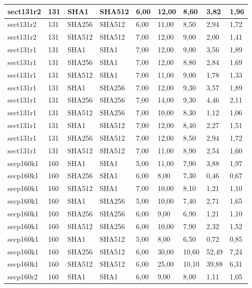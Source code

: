 \begin{longtable}{| l | l | l | l | l |l |l |l |l |}
sect131r2 & 131 & SHA1 & SHA512 & 6,00 & 12,00 & 8,60 & 3,82 & 1,96 \\ \hline 
sect131r2 & 131 & SHA256 & SHA512 & 6,00 & 11,00 & 8,50 & 2,94 & 1,72 \\ \hline 
sect131r2 & 131 & SHA512 & SHA512 & 7,00 & 12,00 & 9,00 & 2,00 & 1,41 \\ \hline 
sect131r1 & 131 & SHA1 & SHA1 & 7,00 & 12,00 & 9,00 & 3,56 & 1,89 \\ \hline 
sect131r1 & 131 & SHA256 & SHA1 & 7,00 & 12,00 & 8,80 & 2,84 & 1,69 \\ \hline 
sect131r1 & 131 & SHA512 & SHA1 & 7,00 & 11,00 & 9,00 & 1,78 & 1,33 \\ \hline 
sect131r1 & 131 & SHA1 & SHA256 & 7,00 & 12,00 & 9,30 & 3,57 & 1,89 \\ \hline 
sect131r1 & 131 & SHA256 & SHA256 & 7,00 & 14,00 & 9,30 & 4,46 & 2,11 \\ \hline 
sect131r1 & 131 & SHA512 & SHA256 & 7,00 & 10,00 & 8,30 & 1,12 & 1,06 \\ \hline 
sect131r1 & 131 & SHA1 & SHA512 & 7,00 & 12,00 & 8,40 & 2,27 & 1,51 \\ \hline 
sect131r1 & 131 & SHA256 & SHA512 & 7,00 & 12,00 & 8,50 & 2,94 & 1,72 \\ \hline 
sect131r1 & 131 & SHA512 & SHA512 & 7,00 & 11,00 & 8,90 & 2,54 & 1,60 \\ \hline 
secp160k1 & 160 & SHA1 & SHA1 & 5,00 & 11,00 & 7,90 & 3,88 & 1,97 \\ \hline 
secp160k1 & 160 & SHA256 & SHA1 & 6,00 & 8,00 & 7,30 & 0,46 & 0,67 \\ \hline 
secp160k1 & 160 & SHA512 & SHA1 & 7,00 & 10,00 & 8,10 & 1,21 & 1,10 \\ \hline 
secp160k1 & 160 & SHA1 & SHA256 & 5,00 & 10,00 & 7,40 & 2,71 & 1,65 \\ \hline 
secp160k1 & 160 & SHA256 & SHA256 & 6,00 & 9,00 & 6,90 & 1,21 & 1,10 \\ \hline 
secp160k1 & 160 & SHA512 & SHA256 & 6,00 & 10,00 & 7,90 & 2,32 & 1,52 \\ \hline 
secp160k1 & 160 & SHA1 & SHA512 & 5,00 & 8,00 & 6,50 & 0,72 & 0,85 \\ \hline 
secp160k1 & 160 & SHA256 & SHA512 & 6,00 & 30,00 & 10,60 & 52,49 & 7,24 \\ \hline 
secp160k1 & 160 & SHA512 & SHA512 & 6,00 & 25,00 & 10,10 & 39,88 & 6,31 \\ \hline 
secp160r2 & 160 & SHA1 & SHA1 & 6,00 & 9,00 & 8,00 & 1,11 & 1,05 \\ \hline 

\end{longtable}
